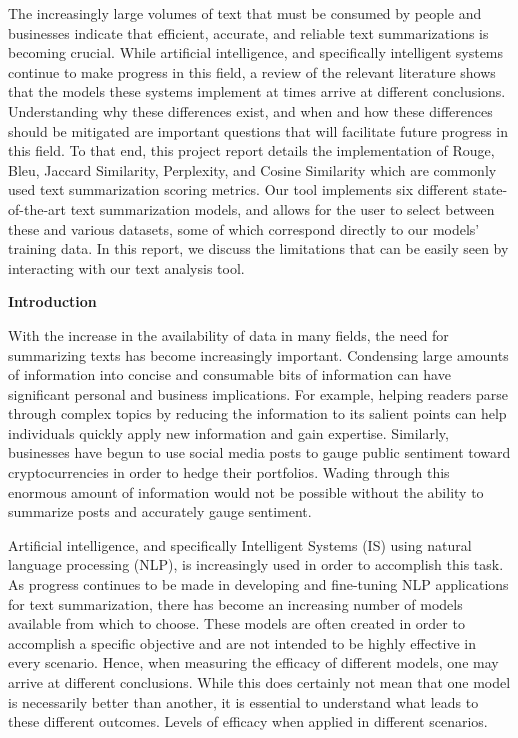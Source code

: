 The increasingly large volumes of text that must be consumed by people and businesses indicate that efficient, accurate, and reliable text summarizations is becoming crucial.
While artificial intelligence, and specifically intelligent systems continue to make progress in this field, a review of the relevant literature shows that the models these systems implement at times arrive at different conclusions.
Understanding why these differences exist, and when and how these differences should be mitigated are important questions that will facilitate future progress in this field.
To that end, this project report details the implementation of Rouge, Bleu, Jaccard Similarity, Perplexity, and Cosine Similarity which are commonly used text summarization scoring metrics.
Our tool implements six different state-of-the-art text summarization models, and allows for the user to select between these and various datasets, some of which correspond directly to our models' training data.
In this report, we discuss the limitations that can be easily seen by interacting with our text analysis tool.


\begin{large}
    \noindent\textbf{Introduction}
\end{large}

\vspace{5pt}

With the increase in the availability of data in many fields, the need for summarizing texts has become increasingly important.
Condensing large amounts of information into concise and consumable bits of information can have significant personal and business implications.
For example, helping readers parse through complex topics by reducing the information to its salient points can help individuals quickly apply new information and gain expertise.
Similarly, businesses have begun to use social media posts to gauge public sentiment toward cryptocurrencies in order to hedge their portfolios\cite{Crypto1, Crypto2}.
Wading through this enormous amount of information would not be possible without the ability to summarize posts and accurately gauge sentiment.

\vspace{5pt}

Artificial intelligence, and specifically Intelligent Systems (IS) using natural language processing (NLP), is increasingly used in order to accomplish this task. As progress continues to be made in developing and fine-tuning NLP applications for text summarization, there has become an increasing number of models available from which to choose.
These models are often created in order to accomplish a specific objective and are not intended to be highly effective in every scenario. Hence, when measuring the efficacy of different models, one may arrive at different conclusions.
While this does certainly not mean that one model is necessarily better than another, it is essential to understand what leads to these different outcomes.
Levels of efficacy when applied in different scenarios. 

